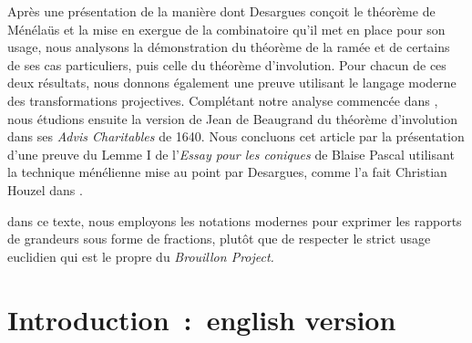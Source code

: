 \documentclass[12pt, a4paper]{article}
\newcommand{\vs}{\vspace*{3mm}}
\begin{document}
Après une présentation de la manière dont Desargues conçoit le théorème de Ménélaüs et la mise en exergue de la combinatoire qu'il met en place pour son usage, nous analysons la démonstration du théorème de la ramée et de certains de ses cas particuliers, puis celle du théorème d'involution. Pour chacun de ces deux résultats, nous donnons également une preuve utilisant le langage moderne des transformations projectives. Complétant notre analyse commencée dans \cite{anglade-briend-1}, nous étudions ensuite la version de Jean de Beaugrand du théorème d'involution dans ses \textit{Advis Charitables} de 1640.
Nous concluons cet article par la présentation d'une preuve du Lemme I de l'\textit{Essay pour les coniques} de Blaise Pascal utilisant la technique ménélienne mise au point par Desargues, comme l'a fait Christian Houzel dans \cite{houzel-pascal}.


\vs
{}dans ce texte, nous employons les notations modernes pour exprimer les rapports de grandeurs sous forme de fractions, plutôt que de respecter le strict usage euclidien qui est le propre du \textit{Brouillon Project.}
\section*{Introduction~:~english version}


\end{document}

